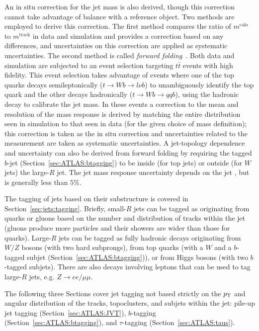 An in situ correction for the jet mass is also derived, though this correction cannot take advantage of \pt{} balance with a reference object.
Two methods are employed to derive this correction.
The first method compares the ratio of $m^\text{calo}$ to $m^\text{track}$ in data and simulation and provides a correction based on any differences, and uncertainties on this correction are applied as systematic uncertainties.
The second method is called \textit{forward folding}~\cite{ATLAS-CONF-2016-008}.
Both data and simulation are subjected to an event selection targeting $t\bar{t}$ events with high fidelity.
This event selection takes advantage of events where one of the top quarks decays semileptonically ($t\rightarrow Wb \rightarrow l\nu b$) to unambiguously identify the top quark and the other decays hadronically ($t\rightarrow Wb \rightarrow qqb$), using the hadronic decay to calibrate the jet mass.
In these events a correction to the mean and resolution of the mass response is derived by matching the entire distribution seen in simulation to that seen in data (for the given choice of mass definition); this correction is taken as the in situ correction and uncertainties related to the measurement are taken as systematic uncertainties.
A jet-topology dependence and uncertainty can also be derived from forward folding by requiring the tagged $b$-jet (Section~\ref{sec:ATLAS:btagging}) to be inside (for top jets) or outside (for $W$ jets) the large-$R$ jet.
The jet mass response uncertainty depends on the jet \pt{}, but is generally less than $5\%$.

The tagging of jets based on their substructure is covered in Section~\ref{sec:jets:tagging}.
Briefly, small-$R$ jets can be tagged as originating from quarks or gluons based on the number and distribution of tracks within the jet (gluons produce more particles and their showers are wider than those for quarks).
Large-$R$ jets can be tagged as fully hadronic decays originating from $W/Z$ bosons (with two hard subprongs), from top quarks (with a $W$ and a $b$-tagged subjet (Section~\ref{sec:ATLAS:btagging})), or from Higgs bosons (with two $b$-tagged subjets).
There are also decays involving leptons that can be used to tag large-$R$ jets, e.g. $Z\rightarrow ee/\mu\mu$.

The following three Sections cover jet tagging not based strictly on the $p_{\text{T}}$ and angular distribution of the tracks, topoclusters, and subjets within the jet: pile-up jet tagging (Section~\ref{sec:ATLAS:JVT}), $b$-tagging (Section~\ref{sec:ATLAS:btagging}), and $\tau$-tagging (Section~\ref{sec:ATLAS:taus}).


